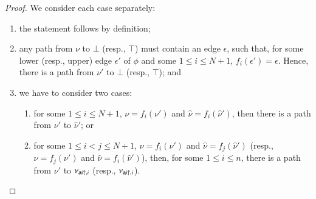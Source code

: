 \begin{proof}
We consider each case separately:
\begin{enumerate}
 \item the statement follows by definition;
 \item any path from $\nu$ to $\bot$ (resp., $\top$) must contain an edge $\epsilon$, such that, for some lower (resp., upper) edge $\epsilon'$ of $\phi$ and some $1\le i\le N+1$, $f_i(\epsilon')=\epsilon$. Hence, there is a path from $\nu'$ to $\bot$ (resp., $\top$); and
 \item we have to consider two cases:
 \begin{enumerate}
  \item for some $1\le i\le N+1$, $\nu=f_i(\nu')$ and $\hat\nu=f_i(\hat\nu')$, then there is a path from $\nu'$ to $\hat\nu'$; or
  \item for some $1\le i<j\le N+1$, $\nu=f_i(\nu')$ and $\hat\nu=f_j(\hat\nu')$ (resp., $\nu=f_j(\nu')$ and $\hat\nu=f_i(\hat\nu')$), then, for some $1\le i\le n$, there is a path from $\nu'$ to $\nu_{{{\mathsf{ai}}{\uparrow}},i}$ (resp., $\nu_{{{\mathsf{ai}}{\uparrow}},i}$).
 \end{enumerate}
\end{enumerate}
\end{proof}

